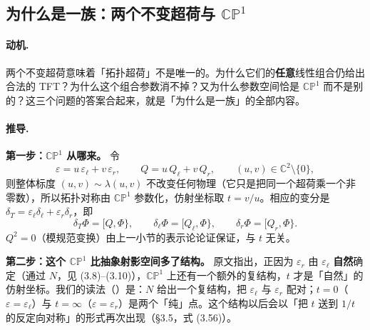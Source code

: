 
\subsection{为什么是一族：两个不变超荷与 $\mathbb{CP}^1$}

\paragraph{动机.}
两个不变超荷意味着「拓扑超荷」不是唯一的。为什么它们的\textbf{任意}线性组合仍给出合法的 TFT？为什么这个组合参数消不掉？又为什么参数空间恰是 $\mathbb{CP}^1$ 而不是别的？这三个问题的答案合起来，就是「为什么是一族」的全部内容。

\paragraph{推导.}

\textbf{第一步：$\mathbb{CP}^1$ 从哪来。} 令
\begin{equation}
\varepsilon=u\,\varepsilon_\ell+v\,\varepsilon_r,
\qquad
Q=u\,Q_\ell+v\,Q_r,
\qquad
(u,v)\in\mathbb C^2\setminus\{0\},
\label{eq:epsuv}
\end{equation}
则整体标度 $(u,v)\sim\lambda(u,v)$ 不改变任何物理（它只是把同一个超荷乘一个非零数），所以拓扑对称由 $\mathbb{CP}^1$ 参数化，仿射坐标取 $t=v/u$\pA{}。相应的变分是 $\delta_T=\varepsilon_\ell\delta_\ell+\varepsilon_r\delta_r$，即
\begin{equation}
\delta_T\Phi=[Q,\Phi\},\qquad
\delta_\ell\Phi=[Q_\ell,\Phi\},\qquad
\delta_r\Phi=[Q_r,\Phi\}.
\label{eq:deltaT}
\end{equation}
$Q^2=0$（模规范变换）由上一小节的表示论论证保证，与 $t$ 无关。

\textbf{第二步：这个 $\mathbb{CP}^1$ 比抽象射影空间多了结构。} 原文指出，正因为 $\varepsilon_r$ 由 $\varepsilon_\ell$ \textbf{自然}确定（通过 $N$，见 (3.8)–(3.10)），$\mathbb{CP}^1$ 上还有一个额外的复结构，$t$ 才是「自然」的仿射坐标\pA{}。我们的读法（\pB）是：$N$ 给出一个复结构，把 $\varepsilon_\ell$ 与 $\varepsilon_r$ 配对；$t=0$（$\varepsilon=\varepsilon_\ell$）与 $t=\infty$（$\varepsilon=\varepsilon_r$）是两个「纯」点。这个结构以后会以「把 $t$ 送到 $1/t$ 的反定向对称」的形式再次出现（§3.5，式 (3.56)）。

